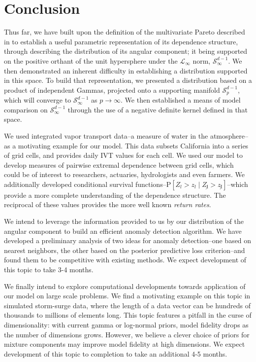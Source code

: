 
\section{Conclusion}
Thus far, we have built upon the definition of the multivariate Pareto described in \cite{ferreira2014}
  to establish a useful parametric representation of its dependence structure, through describing the distribution of its angular component; it being supported on the positive orthant of the unit 
  hypersphere under the $\mathcal{L}_{\infty}$ norm, $\mathcal{S}_{\infty}^{d-1}$.  We then demonstrated an
  inherent difficulty in establishing a distribution supported in this space.  To build that representation,
  we presented a distribution based on a product of independent Gammas, projected onto a supporting manifold
  $\mathcal{S}_{p}^{d-1}$, which will converge to $\mathcal{S}_{\infty}^{d-1}$ as $p\to\infty$.  We then
  established a means of model comparison on $\mathcal{S}_{\infty}^{d-1}$ through the use of a negative
  definite kernel defined in that space.

We used integrated vapor transport data--a measure of water in the atmosphere--as a motivating example for
  our model.  This data subsets California into a series of grid cells, and provides daily IVT values for
  each cell.  We used our model to develop measures of pairwise extremal dependence between grid cells, which
  could be of interest to researchers, actuaries, hydrologists and even farmers.  We additionally developed
  conditional survival functions--$\text{P}\left[Z_l > z_l\mid Z_{\not l} > z_{\not l}\right]$--which provide a more complete understanding of the dependence structure.  The reciprocal of these values provides the more well known \emph{return rates}.

We intend to leverage the information provided to us by our distribution of the angular component to build
  an efficient anomaly detection algorithm.  We have developed a preliminary analysis of two ideas for
  anomaly detection--one based on nearest neighbors, the other based on the posterior predictive loss criterion--and found them to be competitive with existing methods.  We expect development of this topic to take 3-4 months.

We finally intend to explore computational developments towards application of our model on large scale
  problems.  We find a motivating example on this topic in simulated storm-surge data, where the length of 
  a data vector can be hundreds of thousands to millions of elements long.  This topic features a pitfall in the curse of dimensionality: with current gamma or log-normal priors, model fidelity drops as the number of dimensions grows.  However, we believe a clever choice of priors for mixture components may improve model fidelity at high dimensions.  We expect development of this topic to completion to take an additional 4-5 months.
  
